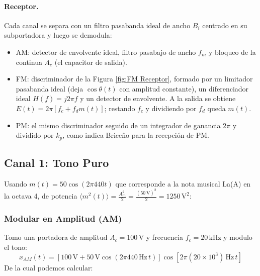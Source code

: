 \documentclass[11pt,a4paper]{article}
\numberwithin{equation}{section}
\begin{document}
\paragraph{Receptor.} Cada canal se separa con un filtro pasabanda ideal de ancho $B_i$ centrado en su subportadora y luego se demodula:
\begin{itemize}
  \item AM: detector de envolvente ideal, filtro pasabajo de ancho $f_m$ y bloqueo de la continua $A_c$ (el capacitor de salida).
  \item FM: discriminador de la Figura \ref{fig:FM Receptor}, formado por un limitador pasabanda ideal (deja $\cos\theta(t)$ con amplitud constante), un diferenciador ideal $H(f)=j2\pi f$ y un detector de envolvente. A la salida se obtiene $E(t)=2\pi[f_c+f_dm(t)]$; restando $f_c$ y dividiendo por $f_d$ queda $m(t)$.
  \item PM: el mismo discriminador seguido de un integrador de ganancia $2\pi$ y dividido por $k_p$, como indica Briceño para la recepción de PM.
\end{itemize}

\subsection{Canal 1: Tono Puro}
Usando $m(t)=50\cos(2\pi 440t)$ que corresponde a la nota musical La(A) en la octava 4, de potencia $\langle m^2(t)\rangle =\frac{A_m^2}{2}=\frac{(50\,\mathrm{V})^2}{2}=1250\,\mathrm{V}^2$:
\subsubsection{Modular en Amplitud (AM)}
Tomo una portadora de amplitud $A_c=100\,\mathrm{V}$ y frecuencia $f_c=20\,\mathrm{kHz}$ y modulo el tono:
\begin{equation}
  x_{AM}(t)=[100\,\mathrm{V} + 50\,\mathrm{V}\cos(2\pi 440\,\mathrm{Hz}\,t)]\cos[2\pi (20 \times 10^3)\,\mathrm{Hz}\,t]
\end{equation}
De la cual podemos calcular:
\end{document}
